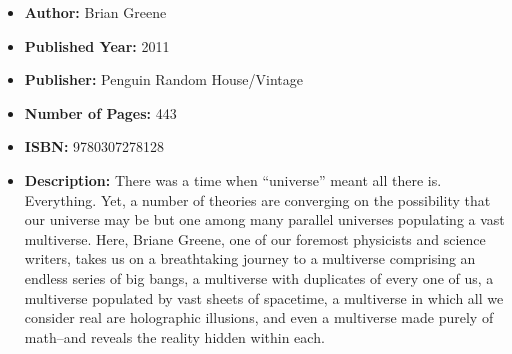 \documentclass{tufte-handout}
\begin{document}
\begin{itemize}
    \item[] \textbf{Author:} Brian Greene 
    \item[] \textbf{Published Year:} 2011
    \item[] \textbf{Publisher:} Penguin Random House/Vintage
    \item[] \textbf{Number of Pages:} 443      
    \item[] \textbf{ISBN:} 9780307278128
    \item[] \textbf{Description:} There was a time when ``universe'' meant all there is. Everything. Yet, a number of theories are converging on the possibility that our universe may be but one among many parallel universes populating a vast multiverse. Here, Briane Greene, one of our foremost physicists and science writers, takes us on a breathtaking journey to a multiverse comprising an endless series of big bangs, a multiverse with duplicates of every one of us, a multiverse populated by vast sheets of spacetime, a multiverse in which all we consider real are holographic illusions, and even a multiverse made purely of math–and reveals the reality hidden within each.
\end{itemize}
\end{document}

